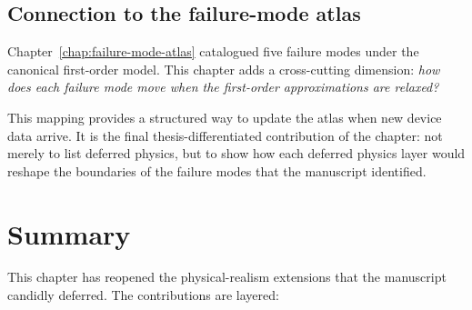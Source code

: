 \subsection{Connection to the failure-mode atlas}

Chapter~\ref{chap:failure-mode-atlas} catalogued five failure modes under the canonical first-order model.  This chapter adds a cross-cutting dimension: \emph{how does each failure mode move when the first-order approximations are relaxed?}

This mapping provides a structured way to update the atlas when new device data arrive.  It is the final thesis-differentiated contribution of the chapter: not merely to list deferred physics, but to show how each deferred physics layer would reshape the boundaries of the failure modes that the manuscript identified.


\section{Summary}
\label{sec:pr-summary}

This chapter has reopened the physical-realism extensions that the manuscript candidly deferred.  The contributions are layered:

